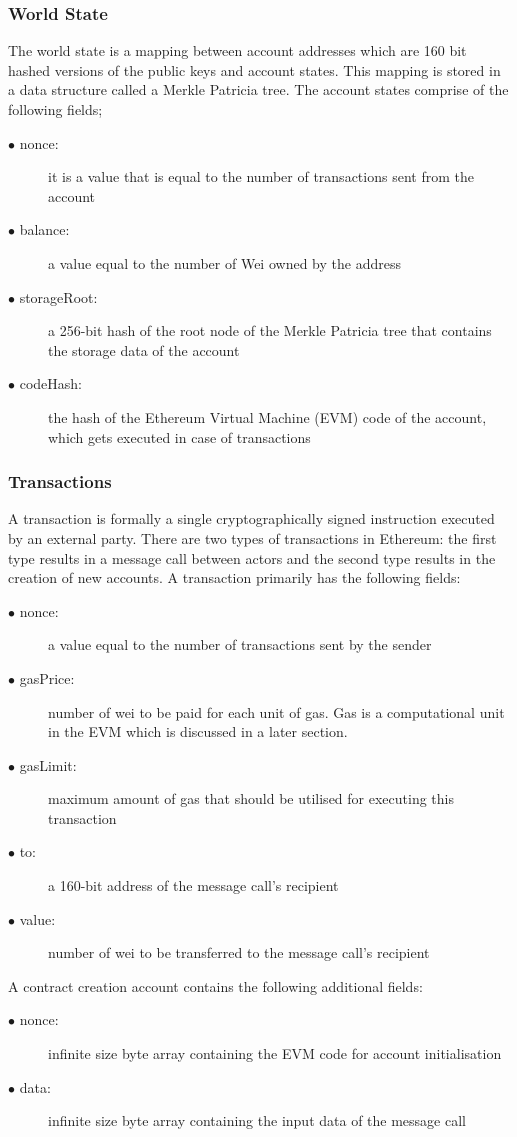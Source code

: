\documentclass[a4paper,twoside,phd]{BYUPhys}
\begin{document}
\subsubsection{World State}
The world state is a mapping between account addresses which are 160 bit hashed versions of the public keys and account states. This mapping is stored in a data structure called a Merkle Patricia tree. The account states comprise of the following fields;
\begin{description}
\item[$\bullet$ nonce:] it is a value that is equal to the number of transactions sent from the account
\item[$\bullet$ balance:] a value equal to the number of Wei owned by the address
\item[$\bullet$ storageRoot:] a 256-bit hash of the root node of the Merkle Patricia tree that contains the storage data of the account
\item[$\bullet$ codeHash:] the hash of the Ethereum Virtual Machine (EVM) code of the account, which gets executed in case of transactions
\end{description}
\subsubsection{Transactions}
A transaction is formally a single cryptographically signed instruction executed by an external party. There are two types of transactions in Ethereum: the first type results in a message call between actors and the second type results in the creation of new accounts. A transaction primarily has the following fields:
\begin{description}
\item[$\bullet$ nonce:] a value equal to the number of transactions sent by the sender
\item[$\bullet$ gasPrice:] number of wei to be paid for each unit of gas. Gas is a computational unit in the EVM which is discussed in a later section.
\item[$\bullet$ gasLimit:] maximum amount of gas that should be utilised for executing this transaction
\item[$\bullet$ to:] a 160-bit address of the message call's recipient 
\item[$\bullet$ value:] number of wei to be transferred to the message call's recipient
\end{description}
A contract creation account contains the following additional fields:
\begin{description}
\item[$\bullet$ nonce:] infinite size byte array containing the EVM code for account initialisation
\item[$\bullet$ data:] infinite size byte array containing the input data of the message call
\end{description}
\begin{description}
\item[]
\end{description}
\end{document}
